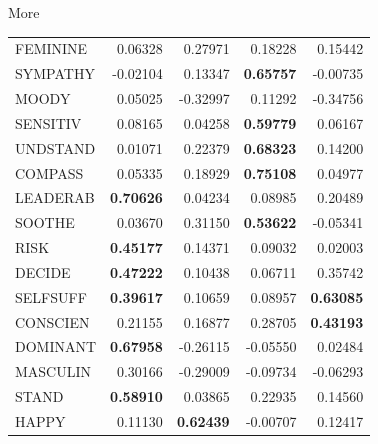 \documentclass[pdf]{prosper}
\begin{document}
\begin{slide}{More}
{\scriptsize
\begin{tabular}{lrrrr}
\hline
 FEMININE     &  0.06328   &    0.27971   &      0.18228  &     0.15442 \\
 SYMPATHY     & -0.02104   &    0.13347   &    {\bf  0.65757}  &    -0.00735 \\
 MOODY        &  0.05025   &   -0.32997   &      0.11292  &    -0.34756 \\
 SENSITIV     &  0.08165   &    0.04258   &    {\bf  0.59779}  &     0.06167 \\
 UNDSTAND     &  0.01071   &    0.22379   &    {\bf  0.68323}  &     0.14200 \\
 COMPASS      &  0.05335   &    0.18929   &    {\bf  0.75108}  &     0.04977 \\
 LEADERAB     &  {\bf 0.70626}   &    0.04234   &      0.08985  &     0.20489 \\
 SOOTHE       &  0.03670   &    0.31150   &   {\bf   0.53622}  &    -0.05341 \\
 RISK         &  {\bf 0.45177}   &    0.14371   &      0.09032  &     0.02003 \\
 DECIDE       &  {\bf 0.47222}   &    0.10438   &      0.06711  &     0.35742 \\
 SELFSUFF     &  {\bf 0.39617}   &    0.10659   &      0.08957  &   {\bf  0.63085} \\
 CONSCIEN     &  0.21155   &    0.16877   &      0.28705  &   {\bf  0.43193} \\
 DOMINANT     &  {\bf 0.67958}   &   -0.26115   &     -0.05550  &     0.02484 \\
 MASCULIN     &  0.30166   &   -0.29009   &     -0.09734  &    -0.06293 \\
 STAND        &  {\bf 0.58910}   &    0.03865   &      0.22935  &     0.14560 \\
 HAPPY        &  0.11130   &  {\bf  0.62439}   &     -0.00707  &     0.12417 \\
\hline
\end{tabular}
}
\end{slide}
\end{document}
